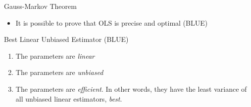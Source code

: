 \documentclass[australian,ignorenonframetext,aspectratio=169]{beamer}
\providecommand{\tightlist}{%
  \setlength{\itemsep}{0pt}\setlength{\parskip}{0pt}}
\begin{document}
\begin{frame}{Gauss-Markov Theorem}
\protect\hypertarget{gauss-markov-theorem}{}

\begin{itemize}
\tightlist
\item
  It is possible to prove that OLS is precise and optimal (BLUE)
\end{itemize}

\begin{block}{Best Linear Unbiased Estimator (BLUE)}

\begin{enumerate}
\tightlist
\item
  The parameters are \emph{linear}
\item
  The parameters are \emph{unbiased}
\item
  The parameters are \emph{efficient}. In other words, they have the
  least variance of all unbiased linear estimators, \emph{best}.
\end{enumerate}

\end{block}

\end{frame}
\end{document}
